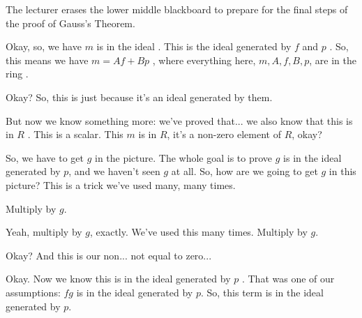 \begin{proofWrapper}
\begin{hidden}
\end{hidden}

\begin{note}
The lecturer erases the lower middle blackboard to prepare for the final steps of the proof of Gauss's Theorem.
\end{note}

\begin{speech}[00:34:34 - 00:36:24]

Okay, so, we have $m$ is in the ideal . This is the ideal generated by $f$ and $p$ . So, this means we have $m = A f + B p$ , where everything here, $m, A, f, B, p$, are in the ring .

Okay? So, this is just because it's an ideal generated by them.

But now we know something more: we've proved that... we also know that this is in $R$ . This is a scalar. This $m$ is in $R$, it's a non-zero element of $R$, okay?

So, we have to get $g$ in the picture. The whole goal is to prove $g$ is in the ideal generated by $p$, and we haven't seen $g$ at all. So, how are we going to get $g$ in this picture? This is a trick we've used many, many times.
\end{speech}

\begin{student}
Multiply by $g$.
\end{student}

\begin{speech}[00:36:24 - 00:37:08]
Yeah, multiply by $g$, exactly. We've used this many times. Multiply by $g$.


Okay? And this is our non... not equal to zero...

Okay. Now we know this is in the ideal generated by $p$ . That was one of our assumptions: $f g$ is in the ideal generated by $p$. So, this term is in the ideal generated by $p$.


\end{speech}
\end{proofWrapper}
